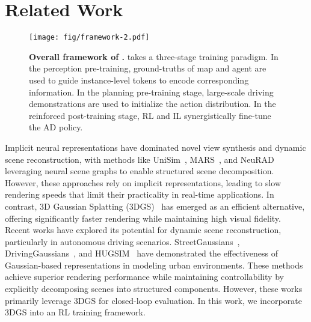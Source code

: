 
\section{Related Work}
\begin{figure*}[ht]
\centering
\texttt{[image: fig/framework-2.pdf]} 
\caption{\textbf{Overall framework of \thename.}  \thename{} takes a three-stage training paradigm.
In the perception pre-training, ground-truths of map and agent are used to guide instance-level tokens to encode corresponding information. In the planning pre-training stage, large-scale driving demonstrations are used to initialize the action distribution. In the reinforced post-training stage, RL and IL synergistically fine-tune the AD policy. }
\label{fig:framework}
\end{figure*}
Implicit neural representations have dominated novel view synthesis and dynamic scene reconstruction, with methods like UniSim~\cite{UniSim}, MARS~\cite{MARS}, and NeuRAD~\cite{NeuRAD} leveraging neural scene graphs to enable structured scene decomposition. However, these approaches rely on implicit representations, leading to slow rendering speeds that limit their practicality in real-time applications. In contrast, 3D Gaussian Splatting (3DGS)~\cite{3dgs} has emerged as an efficient alternative, offering significantly faster rendering while maintaining high visual fidelity. Recent works have explored its potential for dynamic scene reconstruction, particularly in autonomous driving scenarios. StreetGaussians~\cite{StreetGaussians}, DrivingGaussians~\cite{DrivingGaussian}, and HUGSIM~\cite{hugsim} have demonstrated the effectiveness of Gaussian-based representations in modeling urban environments. These methods achieve superior rendering performance while maintaining controllability by explicitly decomposing scenes into structured components. However, these works primarily leverage 3DGS for closed-loop evaluation. In this work, we incorporate 3DGS into an RL training framework.


